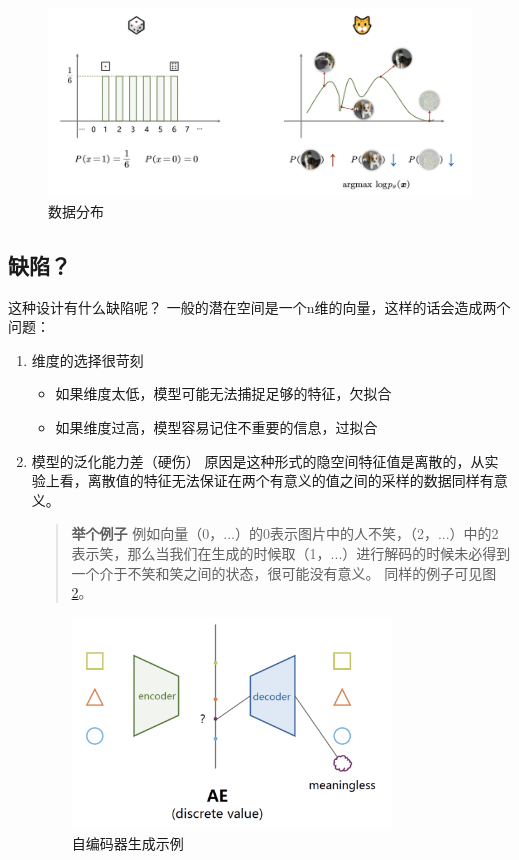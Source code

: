 \begin{figure}[htbp]
    \centering
    \includegraphics[width=\textwidth]{figures/chapter2/dis.png}
    \caption{数据分布}
    \label{fig:data_distribution}
\end{figure}

\subsection{缺陷？}
这种设计有什么缺陷呢？ \newline
一般的潜在空间是一个n维的向量，这样的话会造成两个问题：
\begin{enumerate}
    \item 维度的选择很苛刻 
        \begin{itemize}
            \item 如果维度太低，模型可能无法捕捉足够的特征，欠拟合
            \item 如果维度过高，模型容易记住不重要的信息，过拟合
        \end{itemize}
    \item 模型的泛化能力差（硬伤） \newline
    原因是这种形式的隐空间特征值是离散的，从实验上看，离散值的特征无法保证在两个有意义的值之间的采样的数据同样有意义。
    \begin{quote}
        \textbf{举个例子}
        例如向量（0，...）的0表示图片中的人不笑，（2，...）中的2表示笑，那么当我们在生成的时候取（1，...）进行解码的时候未必得到一个介于不笑和笑之间的状态，很可能没有意义。
        同样的例子可见图\ref{fig:ae_example}。
    \end{quote}
    \begin{figure}[htbp]
        \centering
        \includegraphics[width=0.8\textwidth]{figures/chapter2/aeeee.png}
        \caption{自编码器生成示例}
        \label{fig:ae_example}
    \end{figure}
\end{enumerate}


